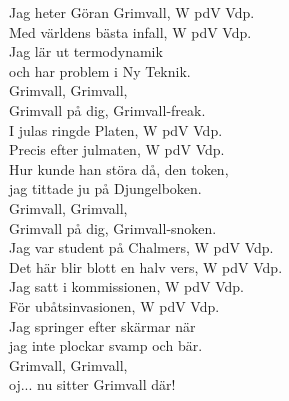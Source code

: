 \documentclass[a6paper, 10pt, twoside]{article}
\begin{document}
\noindent
\begin{center}
\end{center}
\begin{lyrics}
Jag heter Göran Grimvall, W pdV Vdp. \\
Med världens bästa infall, W pdV Vdp. \\
Jag lär ut termodynamik \\
och har problem i Ny Teknik. \\
Grimvall, Grimvall, \\
Grimvall på dig, Grimvall-freak. 
\vspace{5pt} \\
I julas ringde Platen, W pdV Vdp. \\
Precis efter julmaten, W pdV Vdp. \\
Hur kunde han störa då, den token, \\
jag tittade ju på Djungelboken. \\
Grimvall, Grimvall, \\
Grimvall på dig, Grimvall-snoken. 
\vspace{5pt} \\
Jag var student på Chalmers, W pdV Vdp. \\
Det här blir blott en halv vers, W pdV Vdp. 
\vspace{5pt} \\
Jag satt i kommissionen, W pdV Vdp. \\
För ubåtsinvasionen, W pdV Vdp. \\
Jag springer efter skärmar när \\
jag inte plockar svamp och bär. 
\vspace{5pt} \\
Grimvall, Grimvall,\\
oj... nu sitter Grimvall där! 
\end{lyrics}
\end{document}
